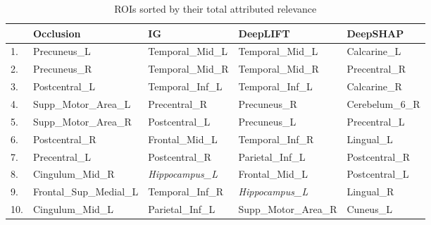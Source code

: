 \begin{table}
	\centering
	\footnotesize
	\begin{subtable}{\textwidth}
		\begin{tabularx}{\textwidth}{lXXXX}
			\toprule
			    & Occlusion               & IG                    & DeepLIFT              & DeepSHAP        \\
			\midrule
			1.  & Precuneus\_L            & Temporal\_Mid\_L      & Temporal\_Mid\_L      & Calcarine\_L    \\
			2.  & Precuneus\_R            & Temporal\_Mid\_R      & Temporal\_Mid\_R      & Precentral\_R   \\
			3.  & Postcentral\_L          & Temporal\_Inf\_L      & Temporal\_Inf\_L      & Calcarine\_R    \\
			4.  & Supp\_Motor\_Area\_L    & Precentral\_R         & Precuneus\_R          & Cerebelum\_6\_R \\
			5.  & Supp\_Motor\_Area\_R    & Postcentral\_L        & Precuneus\_L          & Precentral\_L   \\
			6.  & Postcentral\_R          & Frontal\_Mid\_L       & Temporal\_Inf\_R      & Lingual\_L      \\
			7.  & Precentral\_L           & Postcentral\_R        & Parietal\_Inf\_L      & Postcentral\_R  \\
			8.  & Cingulum\_Mid\_R        & \emph{Hippocampus\_L} & Frontal\_Mid\_L       & Postcentral\_L  \\
			9.  & Frontal\_Sup\_Medial\_L & Temporal\_Inf\_R      & \emph{Hippocampus\_L} & Lingual\_R      \\
			10. & Cingulum\_Mid\_L        & Parietal\_Inf\_L      & Supp\_Motor\_Area\_R  & Cuneus\_L       \\
		\end{tabularx}
		\caption{ROIs sorted by their total attributed relevance}
	\end{subtable}

	\bigskip


\end{table}
